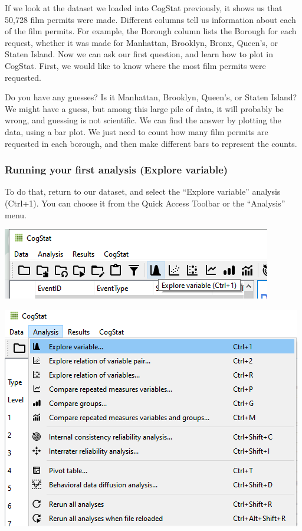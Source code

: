 \documentclass[
]{book}
\begin{document}
If we look at the dataset we loaded into CogStat previously, it shows us that 50,728 film permits were made. Different columns tell us information about each of the film permits. For example, the Borough column lists the Borough for each request, whether it was made for Manhattan, Brooklyn, Bronx, Queen's, or Staten Island. Now we can ask our first question, and learn how to plot in CogStat. First, we would like to know where the most film permits were requested.

Do you have any guesses? Is it Manhattan, Brooklyn, Queen's, or Staten Island? We might have a guess, but among this large pile of data, it will probably be wrong, and guessing is not scientific. We can find the answer by plotting the data, using a bar plot. We just need to count how many film permits are requested in each borough, and then make different bars to represent the counts.

\hypertarget{running-your-first-analysis-explore-variable}{%
\subsubsection{Running your first analysis (Explore variable)}\label{running-your-first-analysis-explore-variable}}

To do that, return to our dataset, and select the ``Explore variable'' analysis (Ctrl+1). You can choose it from the Quick Access Toolbar or the ``Analysis'' menu.

\includegraphics{img/ch1/explorevariable1.png}

\includegraphics{img/ch1/explorevariable2.png}
\end{document}
